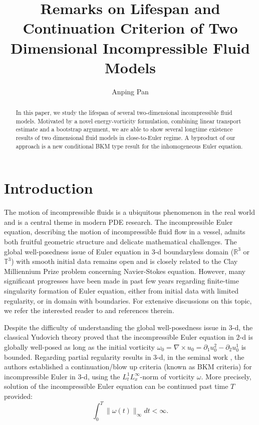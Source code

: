 \documentclass[12pt,letterpaper]{article}
\title{Remarks on Lifespan and Continuation Criterion of Two Dimensional Incompressible Fluid Models}
\author{Anping Pan }
\theoremstyle{plain}
\begin{document}
\maketitle

\begin{abstract}
In this paper, we study the lifespan of several two-dimensional incompressible fluid models. Motivated by a novel energy-vorticity formulation, combining linear transport estimate and a bootstrap argument, we are able to show several longtime existence results of two dimensional fluid models in close-to-Euler regime. A byproduct of our approach is a new conditional BKM type result for the inhomogeneous Euler equation.
\end{abstract}

\tableofcontents

\section{Introduction}

The motion of incompressible fluids is a ubiquitous phenomenon in the real world and is a central theme in modern PDE research. The incompressible Euler equation, describing the motion of incompressible fluid flow in a vessel, admits both fruitful geometric structure and delicate mathematical challenges. The global well-posedness issue of Euler equation in $3$-d boundaryless domain ($\mathbb R^3$ or $\mathbb T^3$) with smooth initial data remains open and is closely related to the Clay Milliennium Prize problem concerning Navier-Stokes equation. However, many significant progresses have been made in past few years regarding finite-time singularity formation of Euler equation, either from initial data with limited regularity, or in domain with boundaries. For extensive discussions on this topic, we refer the interested reader to \cite{[CH21]}\cite{ChenHou2025PNAS}\cite{Elgindi2021}\cite{LuoHou2014} and references therein.

Despite the difficulty of understanding the global well-posedness issue in $3$-d, the classical Yudovich theory \cite{[Yud63]} proved that the incompressible Euler equation in $2$-d is globally well-posed as long as the initial vorticity $\omega_0=\nabla\times u_0=\partial_1u_0^2-\partial_2u_0^1$ is bounded. Regarding partial regularity results in $3$-d, in the seminal work \cite{BealeKatoMajda1984}, the authors established a continuation/blow up criteria (known as BKM criteria) for incompressible Euler in $3$-d, using the $L_t^1L_x^\infty$-norm of vorticity $\omega$. More precisely, solution of the incompressible Euler equation can be continued past time $T$ provided:
\begin{equation}\label{BKM L1Linfty Bound}
\int_0^T \lVert\omega(t)\rVert_\infty dt<\infty .   
\end{equation}
\end{document}
